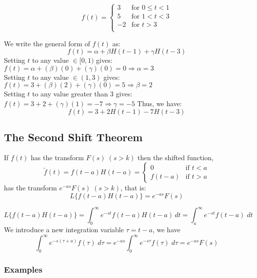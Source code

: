 \documentclass[a4paper, 10pt]{article}
\begin{document}
\begin{examplebox}
  $$f(t) = \begin{cases}
      3  & \text{for } 0 \leq t < 1 \\
      5  & \text{for } 1 < t < 3    \\
      -2 & \text{for } t > 3        \\
    \end{cases}$$

  We write the general form of $f(t)$ as:
  $$f(t) = \alpha + \beta H(t-1) + \gamma H(t-3)$$
  Setting $t$ to any value $\in [0,1)$ gives: $f(t) = \alpha + (\beta)(0) + (\gamma)(0) = 0 \Rightarrow \alpha = 3$ \\
  Setting $t$ to any value $\in (1,3)$ gives: $f(t) = 3 + (\beta)(2) + (\gamma)(0) = 5 \Rightarrow \beta = 2$ \\
  Setting $t$ to any value greater than 3 gives: $f(t) = 3 + 2 + (\gamma)(1) = -7 \Rightarrow \gamma = -5$
  Thus, we have:
  $$f(t) = 3 + 2H(t-1) - 7H(t-3)$$
\end{examplebox}

\pagebreak

\subsection{The Second Shift Theorem}
\begin{theorembox}
  If $f(t)$ has the transform $F(s) \; (s > k)$ then the shifted function,
  $$
    \tilde{f}(t) = f(t-a)H(t-a) = \begin{cases}
      0      & \text{if } t < a \\
      f(t-a) & \text{if } t > a
    \end{cases}
  $$
  has the transform $e^{-as}F(s)\; (s > k)$, that is:
  $$L\{f(t-a)H(t-a)\} = e^{-as}F(s)$$
\end{theorembox}

\begin{proofbox}
  $$L\{f(t-a)H(t-a)\} = \int_0^\infty e^{-st}f(t-a)H(t-a)\, dt = \int_a^\infty e^{-st}f(t-a)\;dt$$
  We introduce a new integration variable $\tau = t-a$, we have
  $$\int_0^\infty e^{-s(\tau + a)}f(\tau)\;d\tau = e^{-as}\int_0^\infty e^{-s\tau}f(\tau)\;d\tau = e^{-as}F(s)$$
\end{proofbox}

\subsubsection{Examples}
\end{document}
